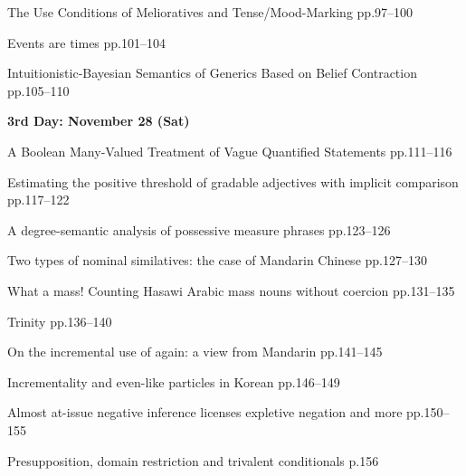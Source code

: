 \documentclass[12pt]{ltjarticle}
\begin{document}
     {The Use Conditions of Melioratives and Tense/Mood-Marking}
     {pp.97--100}




  
     {Events are times}
     {pp.101--104}
  
     {Intuitionistic-Bayesian Semantics of Generics Based on Belief Contraction}
     {pp.105--110}







\noindent\textbf{\large 
3rd Day: November 28 (Sat)
}\\




  
     {A Boolean Many-Valued Treatment of Vague Quantified Statements}
     {pp.111--116}
  
     {Estimating the positive threshold of gradable adjectives with implicit comparison}
     {pp.117--122}
  
     {A degree-semantic analysis of possessive measure phrases}
     {pp.123--126}




  
     {Two types of nominal similatives: the case of Mandarin Chinese}
     {pp.127--130}
  
     {What a mass! Counting Hasawi Arabic mass nouns without coercion}
     {pp.131--135}
  
     {Trinity}
     {pp.136--140}




  
     {On the incremental use of again: a view from Mandarin}
     {pp.141--145}
  
     {Incrementality and even-like particles in Korean}
     {pp.146--149}
  
     {Almost at-issue negative inference licenses expletive negation and more}
     {pp.150--155}




  
     {Presupposition, domain restriction and trivalent conditionals}
     {p.156}







  
\end{document}
